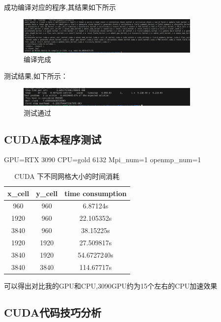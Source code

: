 \documentclass{article}
\begin{document}
\begin{CJK}{UTF8}{gbsn}
\begin{lstlisting}[language=C++]
\end{lstlisting} 
成功编译对应的程序,其结果如下所示
\begin{figure}[H]
    \centering
    \includegraphics[width=0.8\textwidth]{./compile6.png}
    \caption{编译完成}
\end{figure}
测试结果,如下所示：
\begin{figure}[H]
    \centering
    \includegraphics[width=0.8\textwidth]{./compile8.png}
    \caption{测试通过}
\end{figure}
\subsection{CUDA版本程序测试}
GPU=RTX 3090
CPU=gold 6132
Mpi\_num=1
openmp\_num=1
\begin{table}[h!]
    \centering
    \begin{tabular}{|c|c|c|}
    \hline
    \textbf{x\_cell} & \textbf{y\_cell} & \textbf{time consumption} \\
    \hline
    960 & 960 & 6.87124s \\
    \hline
    1920 & 960 & 22.105352s \\
    \hline
    3840 & 960 & 38.15225s \\
    \hline
    1920 & 1920 & 27.509817s \\
    \hline
    3840 & 1920 & 54.6727240s \\
    \hline
    3840 & 3840 & 114.67717s
    \end{tabular}
    \caption{CUDA 下不同网格大小的时间消耗}
    \label{table:combinations}
\end{table}
可以得出对比我的GPU和CPU,3090GPU约为15个左右的CPU加速效果
\subsection{CUDA代码技巧分析}
\end{CJK}
\end{document}
